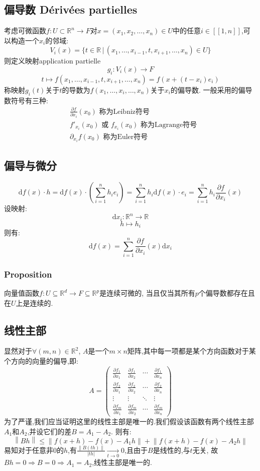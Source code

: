 \documentclass[12pt, a4paper, oneside]{ctexbook}
\newcommand{\di }{\text{d}}%
\newcommand{\pian }{\partial}%
\newcommand{\R }{\mathbb{R}}%
\begin{document}
\subsection{偏导数 Dérivées partielles}
    考虑可微函数$f:U\subset \R^n \rightarrow F$对$x=(x_1,x_2,\dots,x_n)\in U$中的任意$i\in [\![1,n]\!]$,可以构造一个$x_i$的邻域:
    $$
      V_i(x)=\{t\in\R\,|\,(x_1,\dots,x_{i-1},t,x_{i+1},\dots,x_n)\in U \}
    $$
    则定义映射application partielle
    $$
      g_i:V_i(x)\rightarrow F
    $$
    $$
      t\mapsto f(x_1,\dots,x_{i-1},t,x_{i+1},\dots,x_n)=f(x+(t-x_i)e_i)
    $$
    称映射$g_i(t)$关于$t$的导数为$f(x_1,\dots,x_i,\dots,x_n)$关于$x_i$的偏导数.
    一般采用的偏导数符号有三种:\label{myref:lagrangenote}
  \begin{align*}
    & \frac{\partial f}{\partial x_i}(x_0)\text{ 称为Leibniz符号}\\
    & f'_{x_i}(x_0)\text{ 或 }f_{x_i}(x_0) \text{ 称为Lagrange符号}\\
    & \partial_{x_i}f(x_0) \text{ 称为Euler符号}
  \end{align*}
\subsection{偏导与微分}
  $$
    \di f(x)\cdot h=\di f(x)\cdot(\sum_{i=1}^{n}h_ie_i)=\sum_{i=1}^{n}h_i\di f(x)\cdot e_i=\sum_{i=1}^{n} h_i\frac{\pian f}{\pian x_i}(x)
  $$
  设映射:
  $$
    \di x_i:\R^n\rightarrow \R
  $$
  $$
    h\mapsto h_i
  $$
  则有:
  $$
    \di f(x)=\sum_{i=1}^{n}\frac{\pian f}{\pian x_i}(x)\di x_i
  $$
  \subsubsection{Proposition}
  向量值函数$f:U\subseteq \R^d\rightarrow F\subseteq \R^p$是连续可微的,
  当且仅当其所有$p$个偏导数都存在且在$U$上是连续的.
\subsection{线性主部}
    显然对于$\forall (m,n)\in\R^2$, $A$是一个$m\times n$矩阵,其中每一项都是某个方向函数对于某个方向的向量的偏导,即:
    $$
     A=\begin{pmatrix}
      \frac{\partial f_1}{\partial x_1}&\frac{\partial f_1}{\partial x_2}  &\cdots  &\frac{\partial f_1}{\partial x_n} \\
      \frac{\partial f_2}{\partial x_1}&\frac{\partial f_2}{\partial x_2}  & \cdots & \frac{\partial f_2}{\partial x_n}\\ 
      \vdots& \vdots & \ddots  & \vdots\\
      \frac{\partial f_m}{\partial x_1}&\frac{\partial f_m}{\partial x_2} &\cdots & \frac{\partial f_m}{\partial x_n} 
    \end{pmatrix}
    $$
    为了严谨,我们应当证明这里的线性主部是唯一的.我们假设该函数有两个线性主部$A_1$和$A_2$,并设它们的差$B=A_1-A_2$.
    则有:
    $$
      \left\lVert Bh\right\rVert \leq\left\lVert f(x+h)-f(x)-A_1h\right\rVert +\left\lVert f(x+h)-f(x)-A_2h\right\rVert
    $$
    易知对于任意非0的$h$,有$\frac{\left\lVert B(th)\right\rVert}{\left\lvert th\right\rvert}\xrightarrow[t\rightarrow 0]{}0$,且由于$B$是线性的,与$t$无关,
    故$Bh=0\Rightarrow B=0\Rightarrow A_1=A_2$,线性主部是唯一的.
\end{document}
